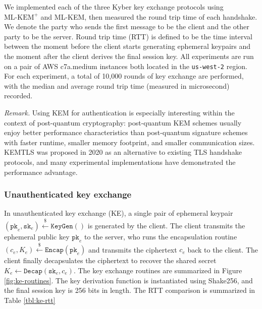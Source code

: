 \documentclass[journal=tches,submission]{iacrtrans}
\newcommand{\keygen}{\texttt{KeyGen}}
\newcommand{\encap}{\texttt{Encap}}
\newcommand{\decap}{\texttt{Decap}}
\newcommand{\pk}{\texttt{pk}}
\newcommand{\sk}{\texttt{sk}}
\newcommand{\leftsample}{\stackrel{\$}{\leftarrow}}
\def\mlkemplus{\text{ML-KEM}^+}
\begin{document}
We implemented each of the three Kyber key exchange protocols using $\mlkemplus$ and ML-KEM, then measured the round trip time of each handshake. We denote the party who sends the first message to be the client and the other party to be the server. Round trip time (RTT) is defined to be the time interval between the moment before the client starts generating ephemeral keypairs and the moment after the client derives the final session key. All experiments are run on a pair of AWS c7a.medium instances both located in the \texttt{us-west-2} region. For each experiment, a total of 10,000 rounds of key exchange are performed, with the median and average round trip time (measured in microsecond) recorded.

\emph{Remark.} Using KEM for authentication is especially interesting within the context of post-quantum cryptography: post-quantum KEM schemes usually enjoy better performance characteristics than post-quantum signature schemes with faster runtime, smaller memory footprint, and smaller communication sizes. KEMTLS \cite{DBLP:conf/ccs/SchwabeSW20} was proposed in 2020 as an alternative to existing TLS handshake protocols, and many experimental implementations have demonstrated the performance advantage.

\subsubsection{Unauthenticated key exchange}\label{sec:unauthenticated-key-exchange}
In unauthenticated key exchange (KE), a single pair of ephemeral keypair $(\pk_e, \sk_e) \leftsample \keygen()$ is generated by the client. The client transmits the ephemeral public key $\pk_e$ to the server, who runs the encapsulation routine $(c_e, K_e) \leftsample \encap(\pk_e)$ and transmits the ciphertext $c_e$ back to the client. The client finally decapsulates the ciphertext to recover the shared secret $K_e \leftarrow \decap(\sk_e, c_e)$. The key exchange routines are summarized in Figure \ref{fig:ke-routines}. The key derivation function is instantiated using Shake256, and the final session key is 256 bits in length. The RTT comparison is summarized in Table \ref{tbl:ke-rtt}
\end{document}
